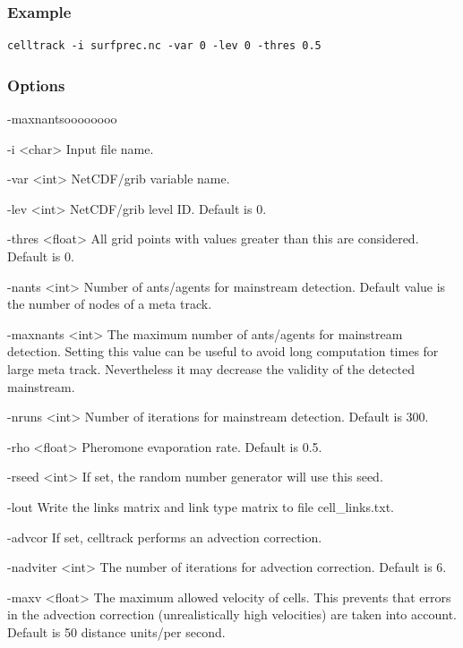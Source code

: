\documentclass{scrartcl}
\begin{document}
\subsubsection*{Example}
\begin{verbatim}
celltrack -i surfprec.nc -var 0 -lev 0 -thres 0.5
\end{verbatim}

\subsubsection*{Options}
\begin{labeling}{-maxnantsoooooooo}
	\item[-i \textless char\textgreater] Input file name.
	\item[-var \textless int\textgreater] NetCDF/grib variable name.
	\item[-lev \textless int\textgreater] NetCDF/grib level ID. Default is 0.
	\item[-thres \textless float\textgreater] All grid points with values greater than this are considered. Default is 0.
	\item[-nants \textless int\textgreater] Number of ants/agents for mainstream detection. Default value is the number of nodes of a meta track.
	\item[-maxnants \textless int\textgreater] The maximum number of ants/agents for mainstream detection. Setting this value can be useful to avoid long computation times for large meta track. Nevertheless it may decrease the validity of the detected mainstream.
	\item[-nruns \textless int\textgreater] Number of iterations for mainstream detection. Default is 300.
	\item[-rho \textless float\textgreater] Pheromone evaporation rate. Default is 0.5.
	\item[-rseed \textless int\textgreater] If set, the random number generator will use this seed.
    \item[-lout] Write the links matrix and link type matrix to file cell\_links.txt.
    \item[-advcor] If set, celltrack performs an advection correction.
    \item[-nadviter \textless int\textgreater] The number of iterations for advection correction. Default is 6.
    \item[-maxv \textless float\textgreater] The maximum allowed velocity of cells. This prevents that errors in the advection correction (unrealistically high velocities) are taken into account. Default is 50 distance units/per second.

\end{labeling}
\end{document}
